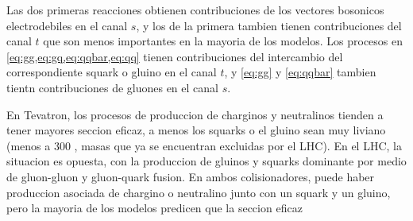 Las dos primeras reacciones obtienen contribuciones de los vectores bosonicos
electrodebiles en el canal $s$, y los de la primera tambien tienen contribuciones
del canal $t$ que son menos importantes en la mayoria de los modelos.
Los procesos en \eqref{eq:gg,eq:gq,eq:qqbar,eq:qq} tienen contribuciones del intercambio
del correspondiente squark o gluino en el canal $t$, y \eqref{eq:gg} y \eqref{eq:qqbar}
tambien tientn contribuciones de gluones en el canal $s$.


En Tevatron, los procesos de produccion de charginos y neutralinos tienden a tener
mayores seccion eficaz, a menos los squarks o el gluino sean muy liviano (menos a 300 \gev,
masas que ya se encuentran excluidas por el LHC). En el LHC, la situacion es opuesta, con la
produccion de gluinos y squarks dominante por medio de gluon-gluon y gluon-quark fusion.
En ambos colisionadores, puede haber produccion asociada de chargino o neutralino junto con
un squark y un gluino, pero la mayoria de los modelos predicen que la seccion eficaz







